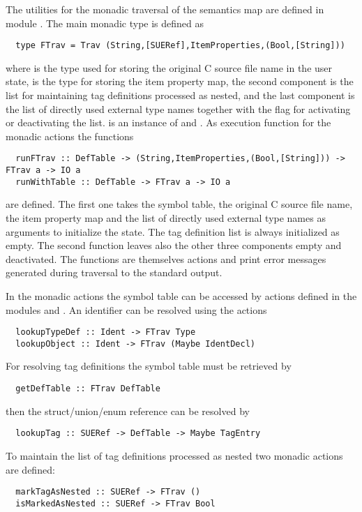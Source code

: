 The utilities for the monadic traversal of the semantics map are defined in module . 
The main monadic type is defined as
\begin{verbatim}
  type FTrav = Trav (String,[SUERef],ItemProperties,(Bool,[String]))
\end{verbatim}
where  is the type used for storing the original C source file name in the user state,
 is the type for storing the item property map, the second component is the list for
maintaining tag definitions processed as nested, and the last component is the list of directly used external type names 
together with the flag for activating or deactivating the list.  is an
instance of  and . As execution function for the monadic actions the functions
\begin{verbatim}
  runFTrav :: DefTable -> (String,ItemProperties,(Bool,[String])) -> FTrav a -> IO a
  runWithTable :: DefTable -> FTrav a -> IO a
\end{verbatim}
are defined. The first one takes the symbol table, the original C source file name, the item property map and
the list of directly used external type names as arguments to initialize the state. The tag definition list
is always initialized as empty. The second 
function leaves also the other three components empty and deactivated. The functions are themselves 
 actions and print error messages generated during traversal to the standard output.

In the monadic actions the symbol table can be accessed by actions defined in the modules 
 and . An identifier can be
resolved using the actions
\begin{verbatim}
  lookupTypeDef :: Ident -> FTrav Type
  lookupObject :: Ident -> FTrav (Maybe IdentDecl)
\end{verbatim}
For resolving tag definitions the symbol table must be retrieved by
\begin{verbatim}
  getDefTable :: FTrav DefTable
\end{verbatim}
then the struct/union/enum reference can be resolved by
\begin{verbatim}
  lookupTag :: SUERef -> DefTable -> Maybe TagEntry
\end{verbatim}
To maintain the list of tag definitions processed as nested two monadic actions are defined:
\begin{verbatim}
  markTagAsNested :: SUERef -> FTrav ()
  isMarkedAsNested :: SUERef -> FTrav Bool
\end{verbatim}

